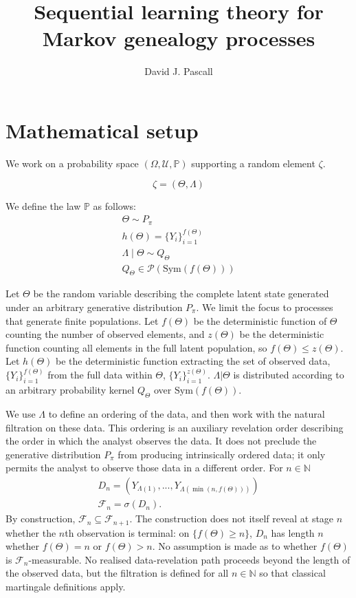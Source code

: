 \documentclass{article}
\title{Sequential learning theory for Markov genealogy processes}
\author[1]{David J. Pascall}
\affil[1]{MRC Biostatistics Unit, University of Cambridge, Cambridge, UK}
\date{}
\newcommand{\1}{\mathbbm{1}}
\begin{document}
\maketitle
\section{Mathematical setup}
We work on a probability space $(\Omega,\mathcal{U},\mathbb{P})$ supporting a random element $\zeta$.

\[\zeta = (\Theta,\Lambda)\]

We define the law $\mathbb{P}$ as follows:
\begin{gather*}
    \Theta \sim P_\pi\\
    h(\Theta)=\{Y_i\}_{i=1}^{f(\Theta)}\\
    \Lambda\mid\Theta \sim Q_\Theta\\
    Q_\Theta \in \mathcal{P}(\mathrm{Sym}(f(\Theta)))
\end{gather*}

Let $\Theta$ be the random variable describing the complete latent state generated under an arbitrary generative distribution $P_\pi$. We limit the focus to processes that generate finite populations. Let $f(\Theta)$ be the deterministic function of $\Theta$ counting the number of observed elements, and $z(\Theta)$ be the deterministic function counting all elements in the full latent population, so $f(\Theta)\leq z(\Theta)$. Let $h(\Theta)$ be the deterministic function extracting the set of observed data, $\{Y_i\}_{i=1}^{f(\Theta)}$ from the full data within $\Theta$, $\{Y_i\}_{i=1}^{z(\Theta)}$. $\Lambda|\Theta$ is distributed according to an arbitrary probability kernel $Q_\Theta$ over $\mathrm{Sym}(f(\Theta))$.

We use $\Lambda$ to define an ordering of the data, and then work with the natural filtration on these data. This ordering is an auxiliary revelation order describing the order in which the analyst observes the data. It does not preclude the generative distribution $P_\pi$ from producing intrinsically ordered data; it only permits the analyst to observe those data in a different order.
For $n\in \mathbb{N}$
\begin{gather*}
    D_n = (Y_{\Lambda(1)},...,Y_{\Lambda(\min(n,f(\Theta)))})\\
    \mathcal{F}_n=\sigma(D_n).
\end{gather*}
By construction, $\mathcal F_n\subseteq \mathcal F_{n+1}$. The construction does not itself reveal at stage $n$ whether the $n$th observation is terminal: on $\{f(\Theta)\ge n\}$, $D_n$ has length $n$ whether $f(\Theta)=n$ or $f(\Theta)>n$. No assumption is made as to whether $f(\Theta)$ is $\mathcal{F}_n$-measurable. No realised data-revelation path proceeds beyond the length of the observed data, but the filtration is defined for all $n \in \mathbb{N}$ so that classical martingale definitions apply.
\end{document}
